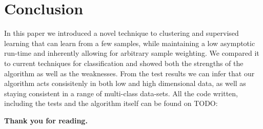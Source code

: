 \documentclass[journal]{IEEEtran}
\begin{document}
\section{Conclusion}
In this paper we introduced a novel technique to clustering and supervised learning that can learn from a few samples, while maintaining a low asymptotic run-time and inherently allowing for arbitrary sample weighting. We compared it to current techniques for classification and showed both the strengths of the algorithm as well as the weaknesses. From the test results we can infer that our algorithm acts consisitenly in both low and high dimensional data, as well as staying consistent in a range of multi-class data-sets. All the code written, including the tests and the algorithm itself can be found on TODO: 


\begin{center}
\textbf{Thank you for reading.}
\end{center}

 

\end{document}
